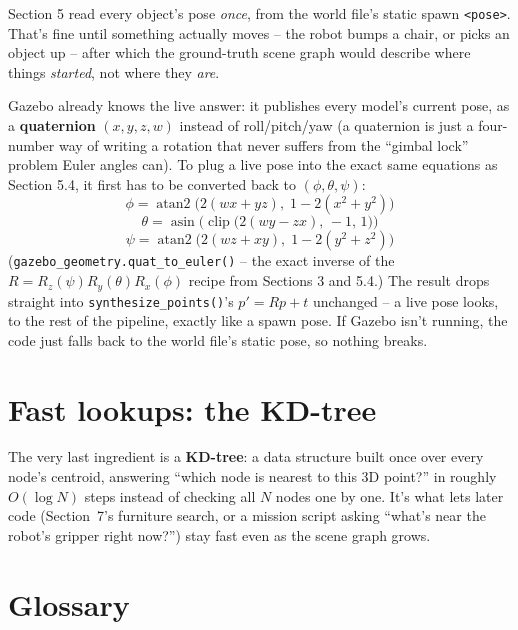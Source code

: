 \documentclass[11pt]{article}
\begin{document}
Section 5 read every object's pose \emph{once}, from the world file's
static spawn \texttt{<pose>}. That's fine until something actually moves --
the robot bumps a chair, or picks an object up -- after which the
ground-truth scene graph would describe where things \emph{started}, not
where they \emph{are}.

Gazebo already knows the live answer: it publishes every model's current
pose, as a \textbf{quaternion} $(x,y,z,w)$ instead of roll/pitch/yaw (a
quaternion is just a four-number way of writing a rotation that never
suffers from the ``gimbal lock'' problem Euler angles can). To plug a live
pose into the exact same equations as Section 5.4, it first has to be
converted back to $(\phi,\theta,\psi)$:
\[
\phi = \operatorname{atan2}\!\big(2(wx+yz),\; 1-2(x^2+y^2)\big)
\]
\[
\theta = \operatorname{asin}\!\Big(\operatorname{clip}\big(2(wy-zx),\,-1,\,1\big)\Big)
\]
\[
\psi = \operatorname{atan2}\!\big(2(wz+xy),\; 1-2(y^2+z^2)\big)
\]
(\texttt{gazebo\_geometry.quat\_to\_euler()} -- the exact inverse of the
$R = R_z(\psi)R_y(\theta)R_x(\phi)$ recipe from Sections 3 and 5.4.) The
result drops straight into \texttt{synthesize\_points()}'s $p' = Rp + t$
unchanged -- a live pose looks, to the rest of the pipeline, exactly like a
spawn pose. If Gazebo isn't running, the code just falls back to the
world file's static pose, so nothing breaks.

\section{Fast lookups: the KD-tree}

The very last ingredient is a \textbf{KD-tree}: a data structure built once
over every node's centroid, answering ``which node is nearest to this 3D
point?'' in roughly $O(\log N)$ steps instead of checking all $N$ nodes one
by one. It's what lets later code (Section~7's furniture search, or a
mission script asking ``what's near the robot's gripper right now?'') stay
fast even as the scene graph grows.

\section{Glossary}
\end{document}
